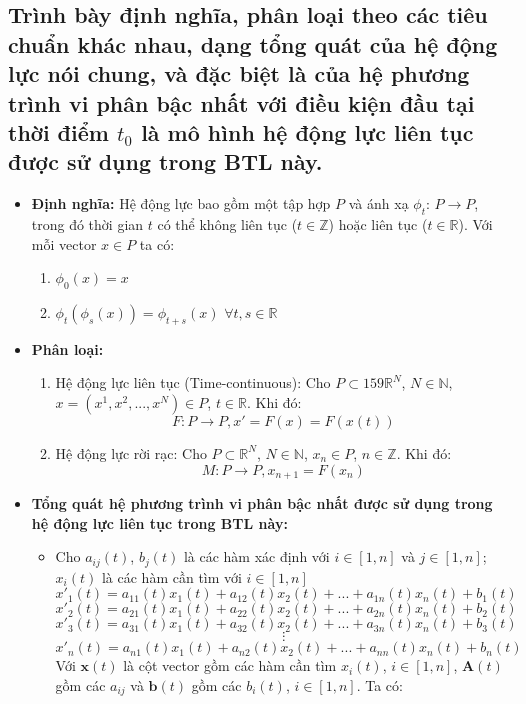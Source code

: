 \documentclass[a4paper]{article}
\begin{document}
	\subsection{Trình bày định nghĩa, phân loại theo các tiêu chuẩn khác nhau, dạng tổng quát của
hệ động lực nói chung, và đặc biệt là của hệ phương trình vi phân bậc nhất với điều kiện đầu tại thời điểm $t_0$ là mô hình hệ động lực liên tục được sử dụng trong BTL
này.}
\begin{itemize}
    \item \textbf{Định nghĩa:} Hệ động lực bao gồm một tập hợp $P$ và ánh xạ $\phi_t$: $P \rightarrow  P$, trong đó thời gian $t$ có thể không liên tục ($t \in \mathbb{Z}$) hoặc liên tục ($t \in \mathbb{R}$). Với mỗi vector $x \in P$ ta có:
        \begin{enumerate}
            \item $\phi_0(x) = x$
            \item $\phi_t(\phi_s(x)) = \phi_{t+s}(x)$ $\forall t,s \in \mathbb{R}$
        \end{enumerate}
    \item \textbf{Phân loại:} 
        \begin{enumerate}
            \item Hệ động lực liên tục (Time-continuous): Cho $P \subset 
159
 \mathbb{R}^N$, $N \in \mathbb{N}$, $x = (x^1, x^2, ..., x^N) \in P$, $t \in \mathbb{R}$. Khi đó: 
                \[{F} : {P} \rightarrow {P}, {x}' = {F(x)} = {F(x(t))}\]
            \item Hệ động lực rời rạc: Cho $P \subset \mathbb{R}^N$, $N \in \mathbb{N}$, $x_n \in P$, $n \in \mathbb{Z}$. Khi đó:
                \[M : P \rightarrow P, x_{n+1} = F(x_n)\]
        \end{enumerate}
    \item \textbf{Tổng quát hệ phương trình vi phân bậc nhất được sử dụng trong hệ động lực liên tục trong BTL này:}
    \begin{itemize}
        \item Cho $a_{ij}(t)$, $b_j(t)$ là các hàm xác định với $i \in [1, n]$ và $j \in [1, n]$; $x_i(t)$ là các hàm cần tìm với $i \in [1, n]$
    \[x'_1(t) = a_{11}(t)x_1(t) + a_{12}(t)x_2(t) + ... + a_{1n}(t)x_n(t) + b_1(t)\]
    \[x'_2(t) = a_{21}(t)x_1(t) + a_{22}(t)x_2(t) + ... + a_{2n}(t)x_n(t) + b_2(t)\]
    \[x'_3(t) = a_{31}(t)x_1(t) + a_{32}(t)x_2(t) + ... + a_{3n}(t)x_n(t) + b_3(t)\]
    \[\vdots\]
    \[x'_n(t) = a_{n1}(t)x_1(t) + a_{n2}(t)x_2(t) + ... + a_{nn}(t)x_n(t) + b_n(t)\]
    Với $\textbf{x}(t)$ là cột vector gồm các hàm cần tìm $x_i(t)$, $i \in [1, n]$, $\textbf{A}(t)$ gồm các $a_{ij}$ và $\textbf{b}(t)$ gồm các $b_i(t)$, $i \in [1, n]$. Ta có:

\end{itemize}
\end{itemize}
\end{document}
